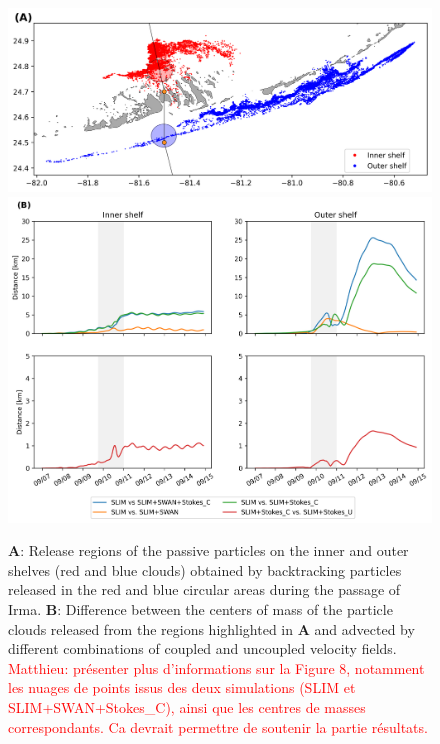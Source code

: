 \documentclass[preprint,12pt,authoryear]{elsarticle}
\begin{document}
\begin{figure}
    \centering
    \includegraphics[width=.85\textwidth]{fig/inner_outer_regions.png}
    \includegraphics[width=.99\textwidth]{fig/inner_outer.png}
    \caption{\textbf{A}: Release regions of the passive particles on the inner and outer shelves (red and blue clouds) obtained by backtracking particles released in the red and blue circular areas during the passage of Irma. \textbf{B}: Difference between the centers of mass of the particle clouds released from the regions highlighted in \textbf{A} and advected by different combinations of coupled and uncoupled velocity fields. \textcolor{red}{Matthieu: présenter plus d'informations sur la Figure 8, notamment les nuages de points issus des deux simulations (SLIM et SLIM+SWAN+Stokes\_C), ainsi que les centres de masses correspondants. Ca devrait permettre de soutenir la partie résultats.}}
    \label{fig:traj}
\end{figure}
\end{document}
